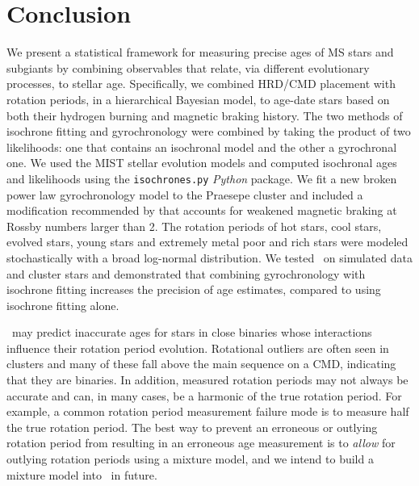 \section{Conclusion}
\label{section:conclusion}

We present a statistical framework for measuring precise ages of MS stars and
subgiants by combining observables that relate, via different evolutionary
processes, to stellar age.
Specifically, we combined HRD/CMD placement with rotation periods, in a
hierarchical Bayesian model, to age-date stars based on both their hydrogen
burning and magnetic braking history.
The two methods of isochrone fitting and gyrochronology were combined by
taking the product of two likelihoods: one that contains an isochronal model
and the other a gyrochronal one.
We used the MIST stellar evolution models and computed isochronal ages and
likelihoods using the {\tt isochrones.py} {\it Python} package.
We fit a new broken power law gyrochronology model to the Praesepe cluster
and included a modification recommended by \citet{vansaders2016} that accounts
for weakened magnetic braking at Rossby numbers larger than 2.
The rotation periods of hot stars, cool stars, evolved stars, young stars and
extremely metal poor and rich stars were modeled stochastically with a broad
log-normal distribution.
We tested \sd\ on simulated data and cluster stars and demonstrated that
combining gyrochronology with isochrone fitting increases the precision of age
estimates, compared to using isochrone fitting alone.

\sd\ may predict inaccurate ages for stars in close binaries whose
interactions influence their rotation period evolution.
Rotational outliers are often seen in clusters \citep[see \eg][]{douglas2016,
rebull2016, douglas2017, rebull2017} and many of these fall above the main
sequence on a CMD, indicating that they are binaries.
In addition, measured rotation periods may not always be accurate and can, in
many cases, be a harmonic of the true rotation period.
For example, a common rotation period measurement failure mode is to measure
half the true rotation period.
The best way to prevent an erroneous or outlying rotation period from
resulting in an erroneous age measurement is to {\it allow} for outlying
rotation periods using a mixture model, and we intend to build a mixture model
into \sd\ in future.

